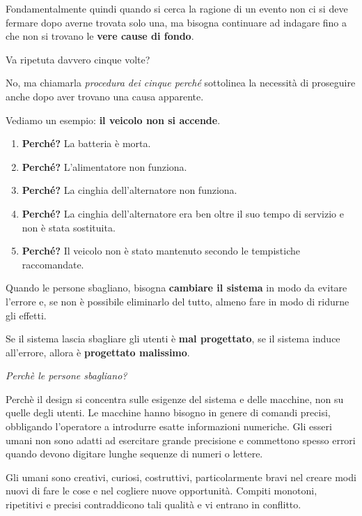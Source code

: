 Fondamentalmente quindi quando si cerca la ragione di un evento non ci si deve fermare dopo averne trovata solo una, ma bisogna continuare ad indagare fino a che non si trovano le \textbf{vere cause di fondo}.

Va ripetuta davvero cinque volte?

No, ma chiamarla \textit{procedura dei cinque perché} sottolinea la necessità di proseguire anche dopo aver trovano una causa apparente.

Vediamo un esempio: \textbf{il veicolo non si accende}.

\begin{enumerate}
	\item \textbf{Perché?} La batteria è morta.
	\item \textbf{Perché?} L'alimentatore non funziona.
	\item \textbf{Perché?} La cinghia dell'alternatore non funziona.
	\item \textbf{Perché?} La cinghia dell'alternatore era ben oltre il suo tempo di servizio e non è stata sostituita.
	\item \textbf{Perché?} Il veicolo non è stato mantenuto secondo le tempistiche raccomandate.
\end{enumerate}

Quando le persone sbagliano, bisogna \textbf{cambiare il sistema} in modo da evitare l'errore
e, se non è possibile eliminarlo del tutto, almeno fare in modo di ridurne gli effetti.

Se il sistema lascia sbagliare gli utenti è \textbf{mal progettato}, se il sistema induce all'errore, allora è \textbf{progettato malissimo}.

\pagebreak

\begin{flushleft}
	\textit{Perchè le persone sbagliano?}
\end{flushleft}

Perchè il design si concentra sulle esigenze del sistema
e delle macchine, non su quelle degli utenti. Le macchine hanno bisogno in genere di
comandi precisi, obbligando l'operatore a introdurre esatte informazioni numeriche. Gli esseri umani non sono adatti ad esercitare grande precisione e commettono spesso
errori quando devono digitare lunghe sequenze di numeri o lettere.

Gli umani sono creativi, curiosi, costruttivi, particolarmente bravi nel creare modi nuovi di fare le cose e nel cogliere nuove opportunità. Compiti monotoni, ripetitivi e precisi contraddicono tali qualità e vi entrano in conflitto.

